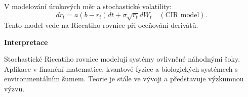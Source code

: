 \begin{example}
V modelování úrokových měr a stochastické volatility:
\[
dr_t = a(b - r_t)dt + \sigma\sqrt{r_t}dW_t \quad (\text{CIR model}).
\]
Tento model vede na Riccatiho rovnice při oceňování derivátů.

\vspace{1.5\baselineskip}

\noindent\textbf{Interpretace}

Stochastické Riccatiho rovnice modelují systémy ovlivněné náhodnými šoky. 
Aplikace v finanční matematice, kvantové fyzice a biologických systémech 
s environmentálním šumem. Teorie je stále ve vývoji a představuje výzkumnou výzvu.

\end{example}

\vspace{2\baselineskip}

